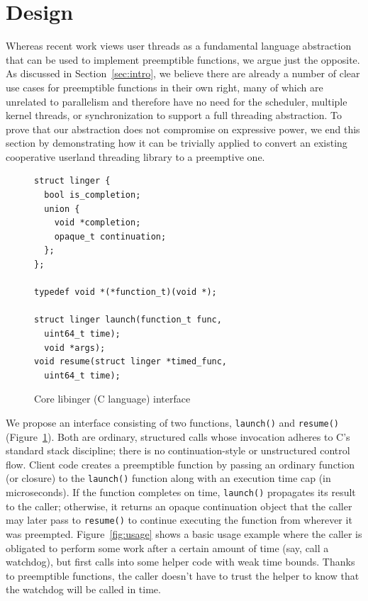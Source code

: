 \section{Design}

Whereas recent work views user threads as a fundamental language abstraction that can
be used to implement preemptible functions, we argue just the opposite.  As discussed
in Section~\ref{sec:intro}, we believe there are already a number of clear use cases
for preemptible functions in their own right, many of which are unrelated to
parallelism and therefore have no need for the scheduler, multiple kernel threads, or
synchronization to support a full threading abstraction.  To prove that our
abstraction does not compromise on expressive power, we end this section by
demonstrating how it can be trivially applied to convert an existing cooperative
userland threading library to a preemptive one.

\begin{figure}
\begin{verbatim}
struct linger {
  bool is_completion;
  union {
    void *completion;
    opaque_t continuation;
  };
};

typedef void *(*function_t)(void *);

struct linger launch(function_t func,
  uint64_t time);
  void *args);
void resume(struct linger *timed_func,
  uint64_t time);
\end{verbatim}
\caption{Core libinger (C language) interface}
\label{fig:interface}
\end{figure}

We propose an interface consisting of two functions, \texttt{launch()} and
\texttt{resume()} (Figure~\ref{fig:interface}).  Both are ordinary, structured calls
whose invocation adheres to C's standard stack discipline; there is no
continuation-style or unstructured control flow.  Client code creates a preemptible
function by passing an ordinary function (or closure) to the \texttt{launch()}
function along with an execution time cap (in microseconds).  If the function
completes on time, \texttt{launch()} propagates its result to the caller; otherwise,
it returns an opaque continuation object that the caller may later pass to
\texttt{resume()} to continue executing the function from wherever it was preempted.
Figure~\ref{fig:usage} shows a basic usage example where the caller is obligated to
perform some work after a certain amount of time (say, call a watchdog), but first
calls into some helper code with weak time bounds.  Thanks to preemptible functions,
the caller doesn't have to trust the helper to know that the watchdog will be called
in time.

